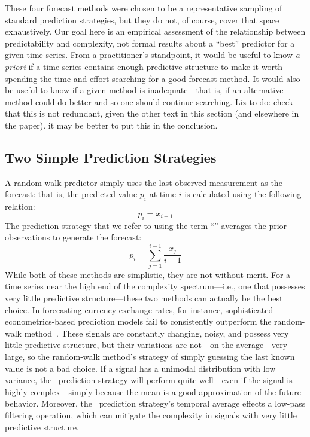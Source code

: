These four forecast methods were chosen to be a representative
sampling of standard prediction strategies, but they do not, of
course, cover that space exhaustively.  Our goal here is an empirical
assessment of the relationship between predictability and complexity,
not formal results about a ``best'' predictor for a given time series.
From a practitioner's standpoint, it would be useful to know \emph{ a
  priori} if a time series contains enough predictive structure to
make it worth spending the time and effort searching for a good
forecast method.  It would also be useful to know if a given method is
inadequate---that is, if an alternative method could do better and so
one should continue searching.  \alert{Liz to do: check that this is
  not redundant, given the other text in this section (and elsewhere
  in the paper).  it may be better to put this in the conclusion.}

\subsection{Two Simple Prediction Strategies}
\label{sec:simple}

A random-walk predictor simply uses the last observed measurement as
the forecast: that is, the predicted value $p_i$ at time $i$ is
calculated using the following relation: $$p_i = x_{i-1}$$ The
prediction strategy that we refer to using the term ``\naive''
averages the prior observations to generate the forecast: $$p_i =
\sum_{j=1}^{i-1}\frac{x_j}{i-1}$$ While both of these methods are
simplistic, they are not without merit.  For a time series near the
high end of the complexity spectrum---i.e., one that possesses very
little predictive structure---these two methods can actually be the
best choice.  In forecasting currency exchange rates, for instance,
sophisticated econometrics-based prediction models fail to
consistently outperform the random-walk method~\cite{rwMeese,rwCCE}.
These signals are constantly changing, noisy, and possess very little
predictive structure, but their variations are not---on the
average---very large, so the random-walk method's strategy of simply
guessing the last known value is not a bad choice.  If a signal has a
unimodal distribution with low variance, the \naive ~prediction
strategy will perform quite well---even if the signal is highly
complex---simply because the mean is a good approximation of the
future behavior.  Moreover, the \naive ~prediction strategy's temporal
average effects a low-pass filtering operation, which can  mitigate the
complexity in signals with very little predictive structure.

